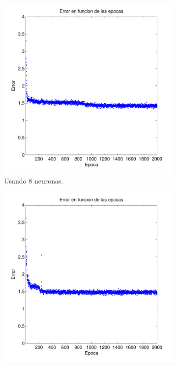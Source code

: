 \documentclass[informe.tex]{subfiles}
\begin{document}
\begin{figure}[H]
        \begin{subfigure}[b]{0.32\textwidth}
                \includegraphics[width=\textwidth]{graficos/error_fold2_8_binary-regresion_2000_01.pdf}
                \caption{Usando 8 neuronas.}
                \label{fig:d2-f2-2k-01-n8}
        \end{subfigure}
        \begin{subfigure}[b]{0.32\textwidth}
                \includegraphics[width=\textwidth]{graficos/error_fold2_10_binary-regresion_2000_01.pdf}

\end{subfigure}
\end{figure}
\end{document}
